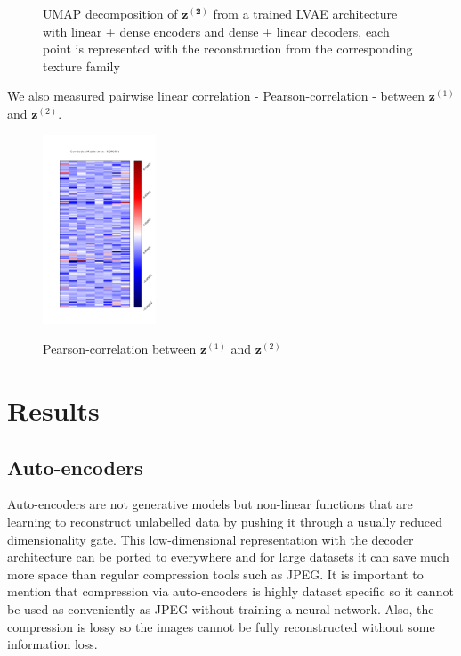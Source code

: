 \documentclass[12pt, english]{article}
\begin{document}
\begin{figure}[H]
\begin{minipage}{0.48\linewidth}
    \caption{UMAP decomposition of $\bm{z^{(2)}}$ from a trained LVAE architecture with linear + dense encoders and dense + linear decoders, each point is represented with the reconstruction from the corresponding texture family} 
    \label{fig:umap-z2-text}
  \end{minipage} 
\end{figure}

\vspace{4mm}

\par We also measured pairwise linear correlation - Pearson-correlation - between $\bm{z}^{(1)}$ and $\bm{z}^{(2)}$.

\vspace{4mm}

\begin{figure}[H]
    \centering
    \includegraphics[width=0.3\textwidth]{z1_z2_correlation.png}
    \label{fig:pearson-matrix}
    \caption{Pearson-correlation between $\bm{z}^{(1)}$ and $\bm{z}^{(2)}$}
\end{figure}

\newpage

\section{Results}

\vspace{7mm}

\subsection{Auto-encoders}

\vspace{5mm}

\par Auto-encoders are not generative models but non-linear functions that are learning to reconstruct unlabelled data by pushing it through a usually reduced dimensionality gate. This low-dimensional representation with the decoder architecture can be ported to everywhere and for large datasets it can save much more space than regular compression tools such as JPEG. It is important to mention that compression via auto-encoders is highly dataset specific so it cannot be used as conveniently as JPEG without training a neural network. Also, the compression is lossy so the images cannot be fully reconstructed without some information loss.
\end{document}
